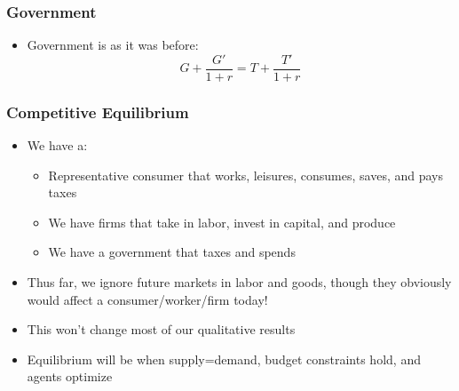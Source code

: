 \documentclass{beamer}
\begin{document}
\begin{frame}
\frametitle[alignment=center]{Government}
\begin{itemize}
\item Government is as it was before:
$$G+\frac{G'}{1+r}=T+\frac{T'}{1+r}$$
\end{itemize}
\end{frame}



\begin{frame}
\frametitle[alignment=center]{Competitive Equilibrium}
\begin{itemize}
\item We have a:
\begin{itemize}
\item Representative consumer that works, leisures, consumes, saves, and pays taxes
\bigskip
\item We have firms that take in labor, invest in capital, and produce
\bigskip
\item We have a government that taxes and spends
\end{itemize}
\item Thus far, we ignore future markets in labor and goods, though they obviously would affect a consumer/worker/firm today!
\bigskip
\item This won't change most of our qualitative results
\bigskip
\item Equilibrium will be when supply=demand, budget constraints hold, and agents optimize
\end{itemize}
\end{frame}
\end{document}
